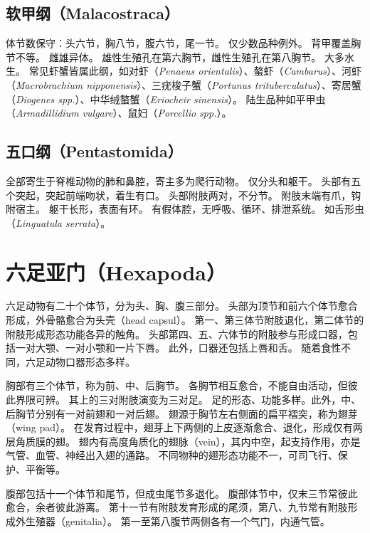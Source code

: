 \documentclass[11pt]{article}
\begin{document}
\subsection{软甲纲（Malacostraca）}
体节数保守：头六节，胸八节，腹六节，尾一节。
仅少数品种例外。
背甲覆盖胸节不等。
雌雄异体。
雄性生殖孔在第六胸节，雌性生殖孔在第八胸节。
大多水生。
常见虾蟹皆属此纲，如对虾（\textit{Penaeus orientalis}）、螯虾（\textit{Cambarus}）、河虾（\textit{Macrobrachium nipponensis}）、三疣梭子蟹（\textit{Portunus trituberculatus}）、寄居蟹（\textit{Diogenes spp.}）、中华绒螯蟹（\textit{Eriocheir sinensis}）。
陆生品种如平甲虫（\textit{Armadillidium vulgare}）、鼠妇（\textit{Porcellio spp.}）。

\subsection{五口纲（Pentastomida）}
全部寄生于脊椎动物的肺和鼻腔，寄主多为爬行动物。
仅分头和躯干。
头部有五个突起，突起前端吻状，着生有口。
头部附肢两对，不分节。
附肢末端有爪，钩附宿主。
躯干长形，表面有环。
有假体腔，无呼吸、循环、排泄系统。
如舌形虫（\textit{Linguatula serrata}）。

\section{六足亚门（Hexapoda）}
六足动物有二十个体节，分为头、胸、腹三部分。
头部为顶节和前六个体节愈合形成，外骨骼愈合为头壳（head capsul）。
第一、第三体节附肢退化，第二体节的附肢形成形态功能各异的触角。
头部第四、五、六体节的附肢参与形成口器，包括一对大颚、一对小颚和一片下唇。
此外，口器还包括上唇和舌。
随着食性不同，六足动物口器形态多样。

\newline

胸部有三个体节，称为前、中、后胸节。
各胸节相互愈合，不能自由活动，但彼此界限可辨。
其上的三对附肢演变为三对足。
足的形态、功能多样。此外，中、后胸节分别有一对前翅和一对后翅。
翅源于胸节左右侧面的扁平褶突，称为翅芽（wing pad）。
在发育过程中，翅芽上下两侧的上皮逐渐愈合、退化，形成仅有两层角质膜的翅。
翅内有高度角质化的翅脉（vein），其内中空，起支持作用，亦是气管、血管、神经出入翅的通路。
不同物种的翅形态功能不一，可司飞行、保护、平衡等。

\newline

腹部包括十一个体节和尾节，但成虫尾节多退化。
腹部体节中，仅末三节常彼此愈合，余者彼此游离。
第十一节有附肢发育形成的尾须，第八、九节常有附肢形成外生殖器（genitalia）。
第一至第八腹节两侧各有一个气门，内通气管。
\end{document}
